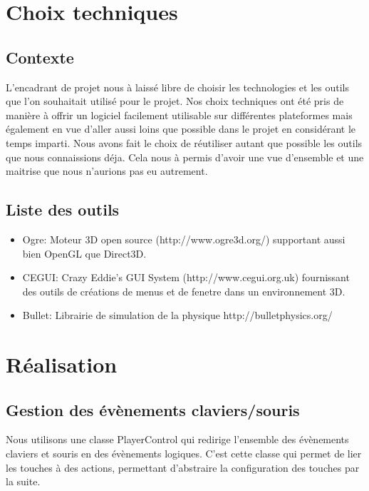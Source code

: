 \documentclass[frenchb,twoside]{EPURapport}
\begin{document}
   
    
    
\chapter{Choix techniques}
    \section{Contexte}
    L'encadrant de projet nous à laissé libre de choisir les technologies et
    les outils que l'on souhaitait utilisé pour le projet. Nos choix techniques
    ont été pris de manière à offrir un logiciel facilement utilisable sur
    différentes plateformes mais également en vue d'aller aussi loins que
    possible dans le projet en considérant le temps imparti. Nous avons fait le
    choix de réutiliser autant que possible les outils que nous connaissions
    déja. Cela nous à permis d'avoir une vue d'ensemble et une maitrise que
    nous n'aurions pas eu autrement.

    \section{Liste des outils}
    \begin{itemize}
        \item Ogre: Moteur 3D open source
        (http://www.ogre3d.org/) supportant aussi bien OpenGL que Direct3D. 
        \item CEGUI: Crazy Eddie's GUI System
        (http://www.cegui.org.uk) fournissant des outils de créations de menus
        et de fenetre dans un environnement 3D.
        \item Bullet: Librairie de simulation de
        la physique http://bulletphysics.org/
    \end{itemize}

\chapter{Réalisation}
    \section{Gestion des évènements claviers/souris}
        Nous utilisons une classe PlayerControl qui redirige l'ensemble des
        évènements claviers et souris en des évènements logiques. C'est cette
        classe qui permet de lier les touches à des actions, permettant
        d'abstraire la configuration des touches par la suite.
\end{document}
